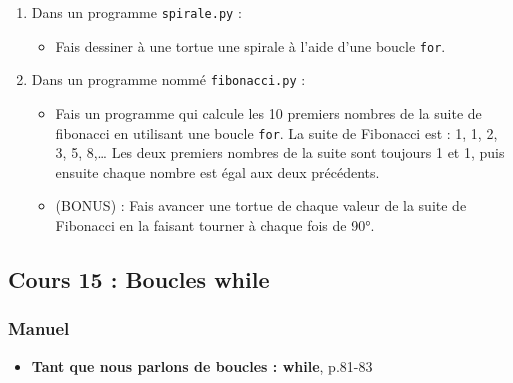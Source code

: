 \documentclass[11pt]{article}
\begin{document}
\begin{enumerate}
\item Dans un programme \texttt{spirale.py} :
\begin{itemize}
\item Fais dessiner à une tortue une spirale à l'aide d'une boucle \texttt{for}.
\end{itemize}

\item Dans un programme nommé \texttt{fibonacci.py} :
\begin{itemize}
\item Fais un programme qui calcule les 10 premiers nombres de la suite de fibonacci en utilisant une boucle \texttt{for}. La suite de Fibonacci est : 1, 1, 2, 3, 5, 8,\ldots{} Les deux premiers nombres de la suite sont toujours 1 et 1, puis ensuite chaque nombre est égal aux deux précédents.
\item (BONUS) : Fais avancer une tortue de chaque valeur de la suite de Fibonacci en la faisant tourner à chaque fois de 90°.
\end{itemize}
\end{enumerate}

\subsection*{Cours 15 : Boucles while}
\label{chapitre5_cours15}
\subsubsection*{Manuel}
\label{sec:org2ca6686}
\begin{itemize}
\item \textbf{\og Tant que nous parlons de boucles : while\fg{}}, p.81-83
\end{itemize}
\end{document}
